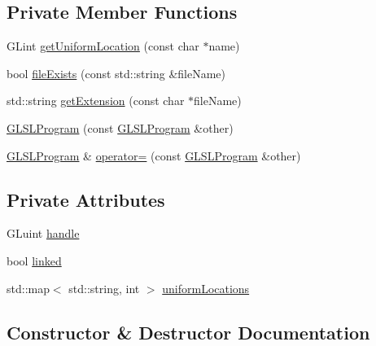 \subsection*{Private Member Functions}
\begin{DoxyCompactItemize}
\item 
G\+Lint \mbox{\hyperlink{class_g_l_s_l_program_a38a5d967d3f7ee46b6a8031bc83495dc}{get\+Uniform\+Location}} (const char $\ast$name)
\item 
bool \mbox{\hyperlink{class_g_l_s_l_program_afe8f370b74009d2b1074b588ec2e9bab}{file\+Exists}} (const std\+::string \&file\+Name)
\item 
std\+::string \mbox{\hyperlink{class_g_l_s_l_program_a0af0a2923bcf9a43d671d321fee7d991}{get\+Extension}} (const char $\ast$file\+Name)
\item 
\mbox{\hyperlink{class_g_l_s_l_program_a2a57576aec33663bc6d4e2827e425016}{G\+L\+S\+L\+Program}} (const \mbox{\hyperlink{class_g_l_s_l_program}{G\+L\+S\+L\+Program}} \&other)
\item 
\mbox{\hyperlink{class_g_l_s_l_program}{G\+L\+S\+L\+Program}} \& \mbox{\hyperlink{class_g_l_s_l_program_a08c4e939087f601a617f6420ea689b7a}{operator=}} (const \mbox{\hyperlink{class_g_l_s_l_program}{G\+L\+S\+L\+Program}} \&other)
\end{DoxyCompactItemize}
\subsection*{Private Attributes}
\begin{DoxyCompactItemize}
\item 
G\+Luint \mbox{\hyperlink{class_g_l_s_l_program_a196bb7b19491ab881fba685aa37c4630}{handle}}
\item 
bool \mbox{\hyperlink{class_g_l_s_l_program_a315534f7754fefdcb0122e97dae78d1a}{linked}}
\item 
std\+::map$<$ std\+::string, int $>$ \mbox{\hyperlink{class_g_l_s_l_program_a20eac534762b6d0485bfb29e104b4932}{uniform\+Locations}}
\end{DoxyCompactItemize}


\subsection{Constructor \& Destructor Documentation}
\mbox{\label{class_g_l_s_l_program_a2a57576aec33663bc6d4e2827e425016}} 
